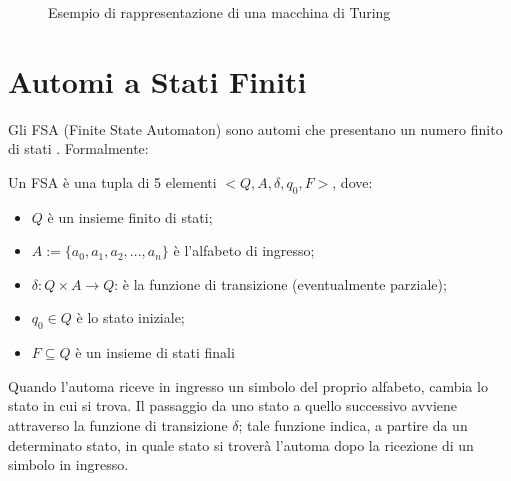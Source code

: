   \begin{figure}[h!]
    \begin{center}
    \end{center}
    \caption{Esempio di rappresentazione di una macchina di Turing}
  \end{figure} 

  \section{Automi a Stati Finiti}
    Gli FSA (Finite State Automaton) sono automi che presentano un numero finito di stati . Formalmente:
    \begin{definition}
      Un FSA è una tupla di 5 elementi \(<Q, A, \delta, q_0, F>\), dove:
      \begin{itemize}
        \item \(Q\) è un insieme finito di stati;
        \item \(A:=\{a_0, a_1, a_2,..., a_n\}\) è l'alfabeto di ingresso;
        \item \(\delta:Q\times A \to Q\): è la funzione di transizione (eventualmente parziale);
        \item \(q_0 \in Q\) è lo stato iniziale;
        \item \(F\subseteq Q\) è un insieme di stati finali
      \end{itemize}
    \end{definition}
    
    Quando l'automa riceve in ingresso un simbolo del proprio alfabeto, cambia lo stato in cui si trova. Il passaggio da uno stato a quello successivo avviene attraverso la funzione di transizione \(\delta\); tale funzione indica, a partire da un determinato stato, in quale stato si troverà l'automa dopo la ricezione di un simbolo in ingresso.
    
